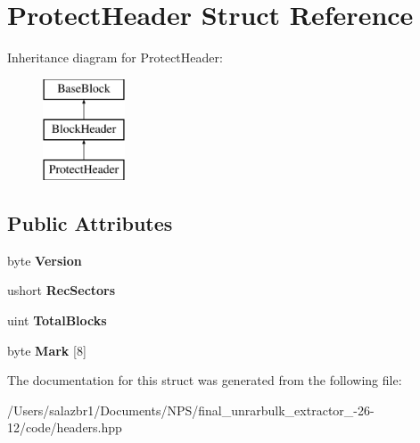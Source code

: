 \hypertarget{struct_protect_header}{\section{Protect\-Header Struct Reference}
\label{struct_protect_header}
}
Inheritance diagram for Protect\-Header\-:\begin{figure}[H]
\begin{center}
\leavevmode
\includegraphics[height=3.000000cm]{struct_protect_header}
\end{center}
\end{figure}
\subsection*{Public Attributes}
\begin{DoxyCompactItemize}
\item 
\hypertarget{struct_protect_header_a6cd775ee9658f19a25765d225955783b}{byte {\bfseries Version}}\label{struct_protect_header_a6cd775ee9658f19a25765d225955783b}

\item 
\hypertarget{struct_protect_header_a88eb56ba56a776a62b1d081e46ebb1eb}{ushort {\bfseries Rec\-Sectors}}\label{struct_protect_header_a88eb56ba56a776a62b1d081e46ebb1eb}

\item 
\hypertarget{struct_protect_header_a3cab4857a0abda2c5bcab0f92e69daca}{uint {\bfseries Total\-Blocks}}\label{struct_protect_header_a3cab4857a0abda2c5bcab0f92e69daca}

\item 
\hypertarget{struct_protect_header_ad9f86b9e6e52b1db7904cabd06beb6bb}{byte {\bfseries Mark} \mbox{[}8\mbox{]}}\label{struct_protect_header_ad9f86b9e6e52b1db7904cabd06beb6bb}

\end{DoxyCompactItemize}


The documentation for this struct was generated from the following file\-:\begin{DoxyCompactItemize}
\item 
/\-Users/salazbr1/\-Documents/\-N\-P\-S/final\-\_\-unrarbulk\-\_\-extractor\-\_-\/26-\/12/code/headers.\-hpp\end{DoxyCompactItemize}
